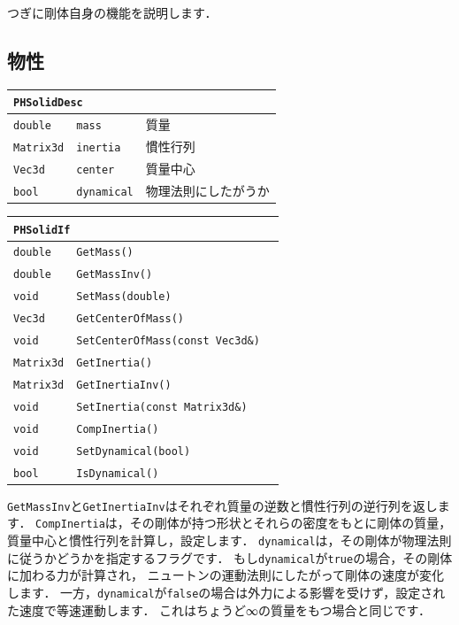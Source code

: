 \KLUDGE つぎに剛体自身の機能を説明します．

\subsection*{\KLUDGE 物性}

\begin{center}
\begin{tabular}{p{.15\hsize}p{.45\hsize}p{.30\hsize}}
\multicolumn{3}{l}{\texttt{PHSolidDesc}}							\\ \midrule
\texttt{double}		&	\texttt{mass}		& \KLUDGE 質量					\\
\texttt{Matrix3d}	&	\texttt{inertia}	& \KLUDGE 慣性行列				\\
\texttt{Vec3d}		&	\texttt{center}		& \KLUDGE 質量中心				\\
\texttt{bool}		&	\texttt{dynamical}	& \KLUDGE 物理法則にしたがうか	\\
\end{tabular}
\end{center}

\begin{center}
\begin{tabular}{p{.15\hsize}p{.45\hsize}p{.30\hsize}}
\multicolumn{3}{l}{\texttt{PHSolidIf}}								\\ \midrule
\texttt{double}		& \texttt{GetMass()}						& \\
\texttt{double} 	& \texttt{GetMassInv()}						& \\
\texttt{void} 		& \texttt{SetMass(double)}					& \\
\texttt{Vec3d} 		& \texttt{GetCenterOfMass()}				& \\
\texttt{void} 		& \texttt{SetCenterOfMass(const Vec3d\&)}	& \\
\texttt{Matrix3d} 	& \texttt{GetInertia()}						& \\
\texttt{Matrix3d} 	& \texttt{GetInertiaInv()}					& \\
\texttt{void} 		& \texttt{SetInertia(const Matrix3d\&)}		& \\
\texttt{void} 		& \texttt{CompInertia()}					& \\
\texttt{void} 		& \texttt{SetDynamical(bool)}				& \\
\texttt{bool} 		& \texttt{IsDynamical()}					& \\
\end{tabular}
\end{center}

\texttt{GetMassInv}\KLUDGE と\texttt{GetInertiaInv}\KLUDGE はそれぞれ質量の逆数と慣性行列の逆行列を返します．
\texttt{CompInertia}\KLUDGE は，その剛体が持つ形状とそれらの密度をもとに剛体の質量，質量中心と慣性行列を計算し，設定します．
\texttt{dynamical}\KLUDGE は，その剛体が物理法則に従うかどうかを指定するフラグです．
\KLUDGE もし\texttt{dynamical}\KLUDGE が\texttt{true}\KLUDGE の場合，その剛体に加わる力が計算され，
\KLUDGE ニュートンの運動法則にしたがって剛体の速度が変化します．
\KLUDGE 一方，\texttt{dynamical}\KLUDGE が\texttt{false}\KLUDGE の場合は外力による影響を受けず，設定された速度で等速運動します．
\KLUDGE これはちょうど∞の質量をもつ場合と同じです．


